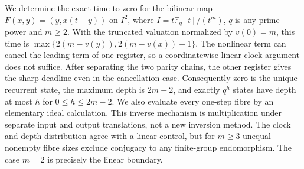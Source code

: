 We determine the exact time to zero for the bilinear map
$F(x,y)=(y,x(t+y))$ on $I^2$, where
$I=t\mathbb F_q[t]/(t^m)$, $q$ is any prime power and $m\geq2$.
With the truncated valuation normalized by $v(0)=m$, this time is
$\max\{2(m-v(y)),2(m-v(x))-1\}$.
The nonlinear term can cancel the leading term of one register, so a
coordinatewise linear-clock argument does not suffice. After separating the
two parity chains, the other register gives the sharp deadline even in the
cancellation case. Consequently zero is the unique recurrent state, the
maximum depth is $2m-2$, and exactly $q^h$ states have depth at most $h$
for $0\leq h\leq2m-2$.
We also evaluate every one-step fibre by an elementary ideal calculation.
This inverse mechanism is multiplication under separate input and output
translations, not a new inversion method. The clock and depth distribution
agree with a linear control, but for $m\geq3$ unequal nonempty fibre sizes
exclude conjugacy to any finite-group endomorphism. The case $m=2$ is
precisely the linear boundary.
